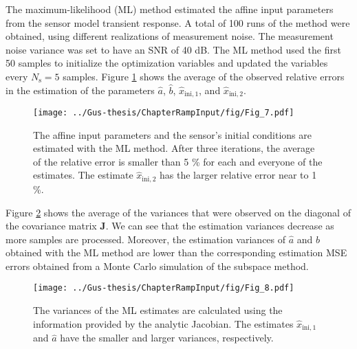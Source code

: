 \documentclass[11pt]{article}
\begin{document}
\begin{itemize}
	\color{blue} 
    The maximum-likelihood (ML) method estimated the affine input parameters from the sensor model transient response.
    A total of 100 runs of the method were obtained, using different realizations of measurement noise.
    The measurement noise variance was set to have an SNR of 40 dB.
    The ML method used the first 50 samples to initialize the optimization variables and updated the variables every $N_{\mathrm{s}} = 5$ samples.
    Figure \ref{fig:rele_lo_40dB_s10} shows the average of the observed relative errors in the estimation of the parameters $\widehat{a}$, $\widehat{b}$, $\widehat{x}_{\mathrm{ini,1}}$, and $\widehat{x}_{\mathrm{ini,2}}$.
    
    \renewcommand{\thefigure}{6.8}
    \begin{figure}[!htbp]
    \centering
    \texttt{[image: ../Gus-thesis/ChapterRampInput/fig/Fig\_7.pdf]} 
    \caption{ \label{fig:rele_lo_40dB_s10} The affine input parameters and the sensor's initial conditions are estimated with the ML method. After three iterations, \color{blue} the average of the relative error is smaller than 5 \% for each and everyone of the estimates. The estimate $\widehat{x}_{\mathrm{ini,2}}$ has the larger relative error near to 1 \%. \color{black} }
    \end{figure}

    Figure \ref{fig:cov_lo_40dB_s1} shows \color{blue} the average \color{black} of the variances that were observed on the diagonal of the covariance matrix $\mathbf{J}$. 
    We can see that the estimation variances decrease as more samples are processed.
    Moreover, the estimation variances of $\widehat{a}$ and $\widehat{b}$ obtained with the ML method are lower than the corresponding estimation MSE errors obtained from a Monte Carlo simulation of the subspace method.

    \renewcommand{\thefigure}{6.9}
    \begin{figure}[!htbp]
    \centering
    \texttt{[image: ../Gus-thesis/ChapterRampInput/fig/Fig\_8.pdf]} 
    \caption{ \label{fig:cov_lo_40dB_s1} The variances of the ML estimates are calculated using the information provided by the analytic Jacobian. \color{blue} The estimates $\widehat{x}_{\mathrm{ini,1}}$ and $\widehat{a}$ have the smaller and larger variances, respectively. \color{black}  }
    \end{figure}

    \color{black} 

\end{itemize}
\end{document}
